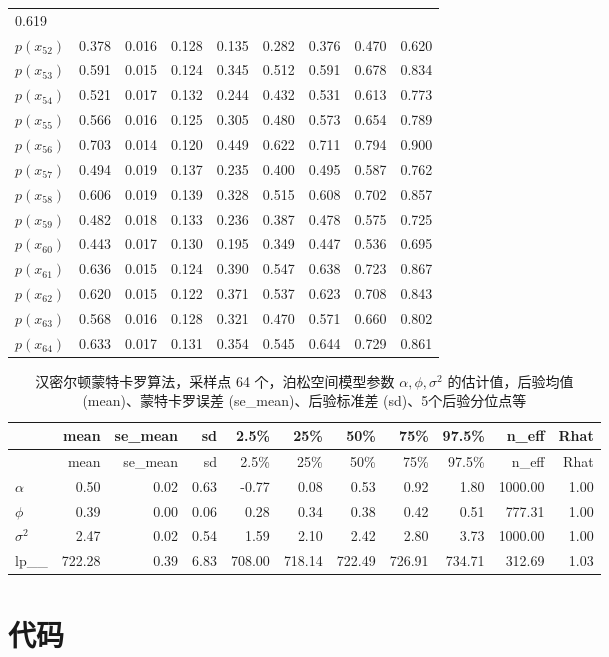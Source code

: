 \documentclass[12pt,a4paper,UTF8,twoside]{book}
\theoremstyle{definition}
\theoremstyle{definition}
\theoremstyle{definition}
\theoremstyle{remark}
\begin{document}
\begin{longtable}[]{@{}lrrrrrrrr@{}}
0.619\tabularnewline
\(p(x_{52})\) & 0.378 & 0.016 & 0.128 & 0.135 & 0.282 & 0.376 & 0.470 &
0.620\tabularnewline
\(p(x_{53})\) & 0.591 & 0.015 & 0.124 & 0.345 & 0.512 & 0.591 & 0.678 &
0.834\tabularnewline
\(p(x_{54})\) & 0.521 & 0.017 & 0.132 & 0.244 & 0.432 & 0.531 & 0.613 &
0.773\tabularnewline
\(p(x_{55})\) & 0.566 & 0.016 & 0.125 & 0.305 & 0.480 & 0.573 & 0.654 &
0.789\tabularnewline
\(p(x_{56})\) & 0.703 & 0.014 & 0.120 & 0.449 & 0.622 & 0.711 & 0.794 &
0.900\tabularnewline
\(p(x_{57})\) & 0.494 & 0.019 & 0.137 & 0.235 & 0.400 & 0.495 & 0.587 &
0.762\tabularnewline
\(p(x_{58})\) & 0.606 & 0.019 & 0.139 & 0.328 & 0.515 & 0.608 & 0.702 &
0.857\tabularnewline
\(p(x_{59})\) & 0.482 & 0.018 & 0.133 & 0.236 & 0.387 & 0.478 & 0.575 &
0.725\tabularnewline
\(p(x_{60})\) & 0.443 & 0.017 & 0.130 & 0.195 & 0.349 & 0.447 & 0.536 &
0.695\tabularnewline
\(p(x_{61})\) & 0.636 & 0.015 & 0.124 & 0.390 & 0.547 & 0.638 & 0.723 &
0.867\tabularnewline
\(p(x_{62})\) & 0.620 & 0.015 & 0.122 & 0.371 & 0.537 & 0.623 & 0.708 &
0.843\tabularnewline
\(p(x_{63})\) & 0.568 & 0.016 & 0.128 & 0.321 & 0.470 & 0.571 & 0.660 &
0.802\tabularnewline
\(p(x_{64})\) & 0.633 & 0.017 & 0.131 & 0.354 & 0.545 & 0.644 & 0.729 &
0.861\tabularnewline
\bottomrule
\end{longtable}

\begin{longtable}[]{@{}lrrrrrrrrrr@{}}
\caption{\label{tab:HMC-Pois-SGLMM} 汉密尔顿蒙特卡罗算法，采样点 64
个，泊松空间模型参数 \(\alpha,\phi,\sigma^2\)
的估计值，后验均值(mean)、蒙特卡罗误差 (se\_mean)、后验标准差
(sd)、5个后验分位点等}\tabularnewline
\toprule
& mean & se\_mean & sd & 2.5\% & 25\% & 50\% & 75\% & 97.5\% & n\_eff &
Rhat\tabularnewline
\midrule
\endfirsthead
\toprule
& mean & se\_mean & sd & 2.5\% & 25\% & 50\% & 75\% & 97.5\% & n\_eff &
Rhat\tabularnewline
\midrule
\endhead
\(\alpha\) & 0.50 & 0.02 & 0.63 & -0.77 & 0.08 & 0.53 & 0.92 & 1.80 &
1000.00 & 1.00\tabularnewline
\(\phi\) & 0.39 & 0.00 & 0.06 & 0.28 & 0.34 & 0.38 & 0.42 & 0.51 &
777.31 & 1.00\tabularnewline
\(\sigma^2\) & 2.47 & 0.02 & 0.54 & 1.59 & 2.10 & 2.42 & 2.80 & 3.73 &
1000.00 & 1.00\tabularnewline
lp\_\_ & 722.28 & 0.39 & 6.83 & 708.00 & 718.14 & 722.49 & 726.91 &
734.71 & 312.69 & 1.03\tabularnewline
\bottomrule
\end{longtable}

\hypertarget{simulate-code}{%
\section*{代码}\label{simulate-code}}
\end{document}
